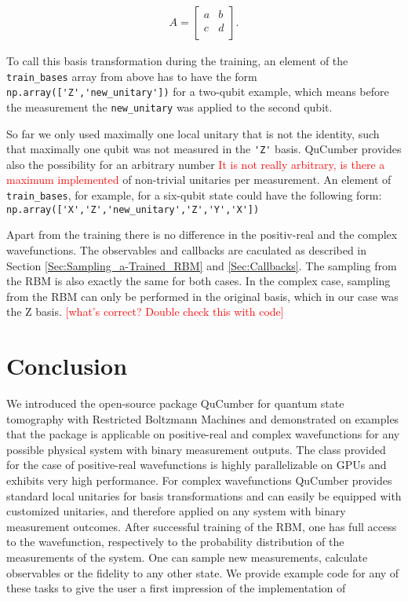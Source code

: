 \documentclass[submission, Phys]{SciPost}
\begin{document}
\begin{align}
	A =
	\begin{bmatrix}
		a & b \\
		c & d \\
	\end{bmatrix}.
\end{align}

To call this basis transformation during the training, an element of the \verb|train_bases| array from above has to have the form
\verb|np.array(['Z','new_unitary'])| for a two-qubit example,
which means before the measurement the \verb|new_unitary| was applied to the second qubit.

So far we only used maximally one local unitary that is not the identity, such that maximally one qubit was not measured in the \verb|'Z'| basis.
QuCumber provides also the possibility for an arbitrary number \textcolor{red}{It is not really arbitrary, is there a maximum implemented} of non-trivial unitaries per measurement.
An element of \verb|train_bases|, for example, for a six-qubit state could have the following form:
\verb|np.array(['X','Z','new_unitary','Z','Y','X'])|

Apart from the training there is no difference in the positiv-real and the complex wavefunctions. The observables and callbacks are caculated as described in Section \ref{Sec:Sampling_a-Trained_RBM} and \ref{Sec:Callbacks}.
The sampling from the RBM is also exactly the same for both cases.
In the complex case, sampling from the RBM can only be performed in the original basis, which in our case was the Z basis.
\textcolor{red}{[what's correct? Double check this with code]}
%

\section{Conclusion}

We introduced the open-source package QuCumber for quantum state tomography with Restricted Boltzmann Machines and demonstrated on examples that
the package is applicable on positive-real and complex wavefunctions for any possible physical system with binary measurement outputs.
The class provided for the case of positive-real wavefunctions is highly parallelizable on GPUs and exhibits very high performance.
For complex wavefunctions QuCumber provides standard local unitaries for basis transformations
and can easily be equipped with customized unitaries, and therefore applied on any system with binary measurement outcomes.
After successful training of the RBM, one has full access to the wavefunction, respectively to the probability distribution of the measurements of the system.
One can sample new measurements, calculate observables or the fidelity to any other state.
We provide example code for any of these tasks to give the user a first impression of the implementation of
\end{document}
